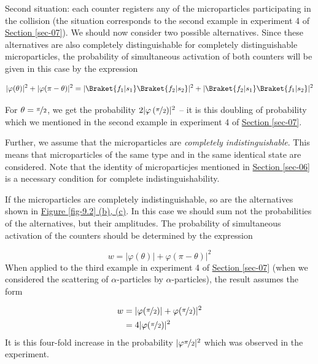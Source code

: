 \documentclass[a4paper,sfsidenotes,colorlinks=true]{tufte-book}
\numberwithin{equation}{section}
\numberwithin{figure}{section}
\begin{document}
Second situation: each counter registers any of the microparticles participating in the collision (the situation corresponds to the second example in experiment 4 of \hyperref[sec-07]{Section \ref{sec-07}}). We should now consider two possible alternatives. Since these alternatives are also completely distinguishable for completely distinguishable microparticles, the probability of simultaneous activation of both counters will be given in this case by the expression

\begin{equation}%
|\varphi (\theta)|^{2}+ |\varphi (\pi - \theta)|^{2} = | \Braket{f_{1}
  | s_{1}} \Braket{f_{2} | s_{2}}|^{2} + |\Braket{f_{2}|s_{1}}\Braket{f_{1}|s_{2}}|^{2}
\label{eq-9.16}
\end{equation}

For $\theta = \nicefrac{\pi}{2}$, we get the probability $2| \varphi \, (\nicefrac{\pi}{2}) |^{2}$ -- it is this doubling of probability which we
mentioned in the second example in experiment 4 of \hyperref[sec-07]{Section \ref{sec-07}}.


Further, we assume that the microparticles are \emph{completely indistinguishable}. This means that microparticles of the same type and in the same identical state are considered. Note that the identity of microparticjes mentioned in \hyperref[sec-06]{Section \ref{sec-06}} is a necessary condition for complete indistinguishability.

If the microparticles are completely indistinguishable, so are the
alternatives shown in \hyperref[fig-9.2]{Figure \ref{fig-9.2} (b),
  (c)}. In  this case we should sum not the probabilities of the alternatives, but their amplitudes. The probability of simultaneous activation of the counters should be determined by the expression

\begin{equation}%
w = |\varphi (\theta)|+ \varphi (\pi - \theta)|^{2}
\label{eq-9.17}
\end{equation}
When applied to the third example in experiment 4 of  \hyperref[sec-07]{Section \ref{sec-07}} (when we considered the scattering of $\alpha$-particles by $\alpha$-particles), the result assumes the form

\begin{equation}%
\begin{split}
w &= |\varphi (\nicefrac{\pi}{2})|+ \varphi (\nicefrac{\pi}{2})|^{2}\\
& = 4 |\varphi(\nicefrac{\pi}{2})|^{2}
\end{split}
\label{eq-9.18}
\end{equation}
It is this four-fold increase in the probability $|\varphi
\nicefrac{\pi}{2}|^{2}$ which was observed in the experiment.
\end{document}
